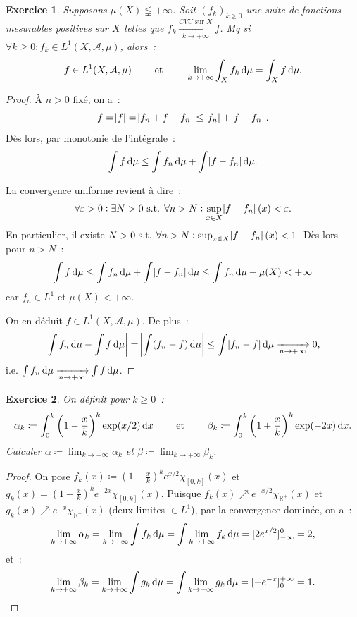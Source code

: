 \documentclass{article}
\newtheorem{ex}{Exercice}[section]
\newcommand{\pinfty}{{+\infty}}
\newcommand{\minfty}{{-\infty}}
\newcommand{\st}{\text{ s.t. }}
\newcommand{\R}{{\mathbb R}}
\begin{document}
\begin{ex} Supposons $\mu(X) \lneqq \pinfty$. Soit $(f_k)_{k \geq 0}$ une suite de fonctions mesurables positives sur $X$ telles que
$f_k \xrightarrow[k \to \pinfty]{CVU \text{ sur }X} f$. Mq si $\forall k \geq 0 : f_k \in L^1(X, \mathcal A, \mu)$, alors~:
\[f \in L^1(X, \mathcal A, \mu) \qquad \text{ et } \qquad \lim_{k \to \pinfty}\int_Xf_k\dif\mu = \int_Xf\dif\mu.\]
\end{ex}

\begin{proof} À $n > 0$ fixé, on a~:
\[f = \abs f = \abs {f_n + f - f_n} \leq \abs {f_n} + \abs {f - f_n}.\]
Dès lors, par monotonie de l'intégrale~:
\[\int f\dif \mu \leq \int f_n\dif \mu + \int \abs {f-f_n}\dif\mu.\]

La convergence uniforme revient à dire~:
\[\forall \varepsilon > 0 : \exists N > 0 \st \forall n > N : \sup_{x \in X}\abs {f - f_n}(x) < \varepsilon.\]
En particulier, il existe $N > 0 \st \forall n > N : \sup_{x \in X}\abs {f - f_n}(x) < 1$. Dès lors pour $n > N$~:
\[\int f\dif\mu \leq \int f_n\dif \mu + \int \abs {f - f_n}\dif \mu \leq \int f_n \dif\mu + \mu(X) < \pinfty\]
car $f_n \in L^1$ et $\mu(X) < \pinfty$.

On en déduit $f \in L^1(X, \mathcal A, \mu)$. De plus~:
\[\abs {\int f_n\dif\mu - \int f\dif\mu} = \abs {\int (f_n-f)\dif\mu} \leq \int \abs {f_n - f}\dif\mu \xrightarrow[n \to \pinfty]{} 0,\]
i.e. $\int f_n\dif\mu \xrightarrow[n \to \pinfty]{} \int f\dif\mu$.
\end{proof}

\begin{ex} On définit pour $k \geq 0$~:
\[\alpha_k \coloneqq \int_0^k\left(1 - \frac xk\right)^k\exp(x/2)\dif x \qquad \text{ et } \qquad \beta_k \coloneqq \int_0^k\left(1 + \frac xk\right)^k\exp(-2x)\dif x.\]
Calculer $\alpha \coloneqq \lim_{k \to \pinfty}\alpha_k$ et $\beta \coloneqq \lim_{k \to \pinfty} \beta_k$.
\end{ex}

\begin{proof} On pose $f_k(x) \coloneqq \left(1-\frac xk\right)^ke^{x/2}\chi_{[0, k]}(x)$ et $g_k(x) = \left(1+\frac xk\right)^ke^{-2x}\chi_{[0, k]}(x)$.
Puisque $f_k(x) \nearrow e^{-x/2}\chi_{\R^+}(x)$ et $g_k(x) \nearrow e^{-x}\chi_{\R^+}(x)$ (deux limites $\in L^1$), par la convergence dominée, on a~:
\[\lim_{k \to \pinfty} \alpha_k = \lim_{k \to \pinfty}\int f_k\dif\mu = \int\lim_{k \to \pinfty}f_k\dif\mu = [2e^{x/2}]_{\minfty}^0 = 2,\]
et~:
\[\lim_{k \to \pinfty}\beta_k = \lim_{k \to \pinfty}\int g_k\dif\mu = \int\lim_{k \to \pinfty}g_k\dif\mu = [-e^{-x}]_0^\pinfty = 1.\]
\end{proof}
\end{document}
